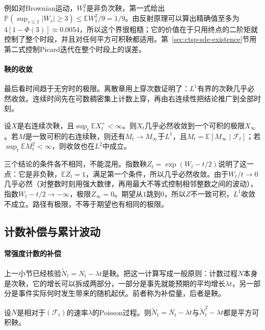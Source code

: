 例如对Brownian运动，$W_t^2$是非负次鞅，第一式给出$\mathbb P(\sup_{s\leq1}|W_s|\geq3)\leq\mathbb EW_1^2/9=1/9$。由反射原理可以算出精确值至多为$4[1-\Phi(3)]\approx0.0054$，所以这个界很粗糙；它的价值在于只用终点的二阶矩就控制了整个时段，并且对任何平方可积鞅都适用。第~\ref{sec:ctsp-sde-existence}节用第二式控制Picard迭代在整个时段上的误差。

\paragraph{鞅的收敛}
最后看时间趋于无穷时的极限。离散章用上穿次数证明了：$L^1$有界的次鞅几乎必然收敛。连续时间先在可数稠密集上计数上穿，再由右连续性把结论推广到全部时刻。

\begin{theorem}[连续时间鞅收敛]
  \label{thm:ctsp-martingale-convergence}
  设$X$是右连续次鞅，且$\sup_t\mathbb EX_t^+<\infty$。则$X_t$几乎必然收敛到一个可积的极限$X_\infty$。若$M$是一致可积的右连续鞅，则还有$M_t\to M_\infty$于$L^1$，且$M_t=\mathbb E[M_\infty\mid\mathcal F_t]$；若$\sup_t\mathbb EM_t^2<\infty$，则收敛也在$L^2$中成立。
\end{theorem}

三个结论的条件各不相同，不能混用。指数鞅$Z_t=\exp(W_t-t/2)$说明了这一点：它是非负鞅，$\mathbb EZ_t=1$，满足第一个条件，所以几乎必然收敛。由于$W_t/t\to0$几乎必然（对整数时刻用强大数律，再用最大不等式控制相邻整数之间的波动），指数$W_t-t/2\to-\infty$，极限$Z_\infty=0$。期望从$1$跳到$0$，所以$Z$不一致可积，$L^1$收敛不成立。路径有极限，不等于期望也有相同的极限。

\subsection{计数补偿与累计波动}
\label{sec:ctsp-compensation}

\paragraph{常强度计数的补偿}
上一小节已经核验$\widetilde N_t=N_t-\lambda t$是鞅。把这一计算写成一般原则：计数过程$N$本身是次鞅，它的增长可以拆成两部分，一部分是事先就能预期的平均增长$\lambda t$，另一部分是事件实际何时发生带来的随机起伏。前者称为补偿量，后者是鞅。

\begin{theorem}[Poisson补偿]
  \label{thm:ctsp-poisson-compensation}
  设$N$是相对于$(\mathcal F_t)$的速率$\lambda$的Poisson过程。则$\widetilde N_t=N_t-\lambda t$与$\widetilde N_t^2-\lambda t$都是平方可积鞅。
\end{theorem}

